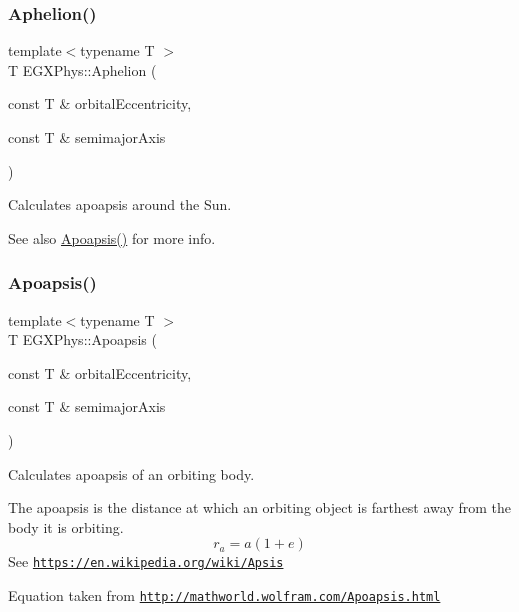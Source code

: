 \subsubsection{\texorpdfstring{Aphelion()}{Aphelion()}}
{\footnotesize\ttfamily template$<$typename T $>$ \\
T E\+G\+X\+Phys\+::\+Aphelion (\begin{DoxyParamCaption}\item[{const T \&}]{orbital\+Eccentricity,  }\item[{const T \&}]{semimajor\+Axis }\end{DoxyParamCaption})}



Calculates apoapsis around the Sun. 

\begin{DoxySeeAlso}{See also}
\hyperlink{group___apoapsis_gaf962e650bf84a568458e8eb39b1c61ba}{Apoapsis()} for more info. 
\end{DoxySeeAlso}
\mbox{\label{group___apoapsis_gaf962e650bf84a568458e8eb39b1c61ba}} 
\subsubsection{\texorpdfstring{Apoapsis()}{Apoapsis()}}
{\footnotesize\ttfamily template$<$typename T $>$ \\
T E\+G\+X\+Phys\+::\+Apoapsis (\begin{DoxyParamCaption}\item[{const T \&}]{orbital\+Eccentricity,  }\item[{const T \&}]{semimajor\+Axis }\end{DoxyParamCaption})}



Calculates apoapsis of an orbiting body. 

The apoapsis is the distance at which an orbiting object is farthest away from the body it is orbiting. \[r_a=a(1+e)\] See \href{https://en.wikipedia.org/wiki/Apsis}{\tt https\+://en.\+wikipedia.\+org/wiki/\+Apsis}

Equation taken from \href{http://mathworld.wolfram.com/Apoapsis.html}{\tt http\+://mathworld.\+wolfram.\+com/\+Apoapsis.\+html}


